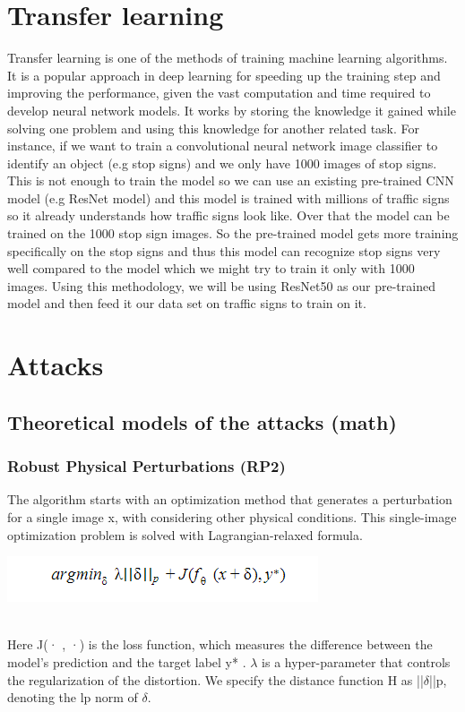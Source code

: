\documentclass[sigconf, nonacm]{acmart}
\begin{document}
\section{Transfer learning}
Transfer learning is one of the methods of training machine learning algorithms. It is a popular approach in deep learning for speeding up the training step and improving the performance, given the vast computation and time required to develop neural network models. It works by storing the knowledge it gained while solving one problem and using this knowledge for another related task. For instance, if we want to train a convolutional neural network image classifier to identify an object (e.g stop signs) and we only have 1000 images of stop signs. This is not enough to train the model so we can use an existing pre-trained CNN model (e.g ResNet model) and this model is trained with millions of traffic signs so it already understands how traffic signs look like. Over that the model can be trained on the 1000 stop sign images. So the pre-trained model gets more training specifically on the stop signs and thus this model can recognize stop signs very well compared to the model which we might try to train it only with 1000 images. Using this methodology, we will be using ResNet50 as our pre-trained model and then feed it our data set on traffic signs to train on it.
\section{Attacks}
\subsection{Theoretical models of the attacks (math) }
\subsubsection{ Robust Physical Perturbations (RP2) }
The algorithm starts with an optimization method that generates a perturbation for a single image x, with considering other physical conditions. This single-image optimization problem is solved with Lagrangian-relaxed formula\cite{Abril07}. 

\includegraphics[scale=0.75]{file 1.png}

\\Here J(· , ·) is the loss function, which measures the difference between the model’s prediction and the target label y* . $\lambda $ is a hyper-parameter that controls the regularization of the distortion. We specify the distance function H as ||$\delta$||p, denoting the lp norm of $\delta$.
\end{document}
